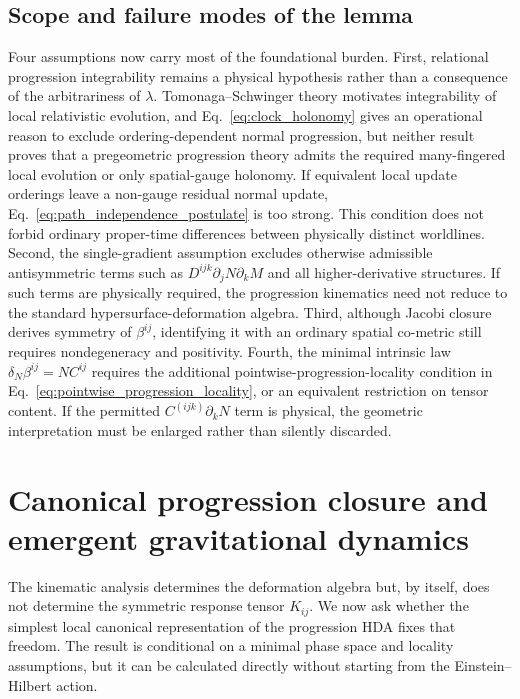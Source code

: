 \documentclass[11pt]{article}
\begin{document}
\subsection{Scope and failure modes of the lemma}

Four assumptions now carry most of the foundational burden. First, relational progression integrability remains a physical hypothesis rather than a consequence of the arbitrariness of $\lambda$. Tomonaga--Schwinger theory motivates integrability of local relativistic evolution, and Eq.~\eqref{eq:clock_holonomy} gives an operational reason to exclude ordering-dependent normal progression, but neither result proves that a pregeometric progression theory admits the required many-fingered local evolution or only spatial-gauge holonomy. If equivalent local update orderings leave a non-gauge residual normal update, Eq.~\eqref{eq:path_independence_postulate} is too strong. This condition does not forbid ordinary proper-time differences between physically distinct worldlines. Second, the single-gradient assumption excludes otherwise admissible antisymmetric terms such as $D^{ijk}\partial_jN\partial_kM$ and all higher-derivative structures. If such terms are physically required, the progression kinematics need not reduce to the standard hypersurface-deformation algebra. Third, although Jacobi closure derives symmetry of $\beta^{ij}$, identifying it with an ordinary spatial co-metric still requires nondegeneracy and positivity. Fourth, the minimal intrinsic law $\delta_N\beta^{ij}=NC^{ij}$ requires the additional pointwise-progression-locality condition in Eq.~\eqref{eq:pointwise_progression_locality}, or an equivalent restriction on tensor content. If the permitted $C^{(ijk)}\partial_kN$ term is physical, the geometric interpretation must be enlarged rather than silently discarded.


\section{Canonical progression closure and emergent gravitational dynamics}
\label{sec:canonical_closure}

The kinematic analysis determines the deformation algebra but, by itself, does not determine the symmetric response tensor $K_{ij}$. We now ask whether the simplest local canonical representation of the progression HDA fixes that freedom. The result is conditional on a minimal phase space and locality assumptions, but it can be calculated directly without starting from the Einstein--Hilbert action.
\end{document}

